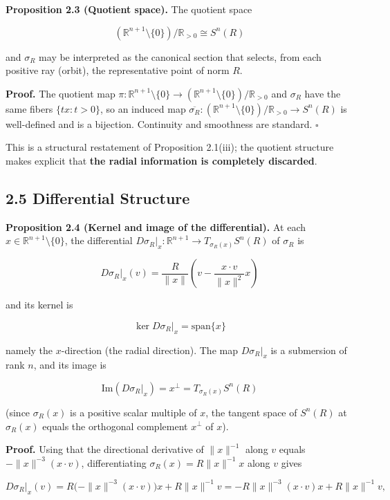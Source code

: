\documentclass[
]{ltjsarticle}
\begin{document}
\textbf{Proposition 2.3 (Quotient space).} The quotient space

\[(\mathbb{R}^{n+1} \setminus \{0\}) / \mathbb{R}_{>0} \cong S^n(R)\]

and \(\sigma_R\) may be interpreted as the canonical section that
selects, from each positive ray (orbit), the representative point of
norm \(R\).

\textbf{Proof.} The quotient map
\(\pi: \mathbb{R}^{n+1} \setminus \{0\} \to (\mathbb{R}^{n+1} \setminus \{0\}) / \mathbb{R}_{>0}\)
and \(\sigma_R\) have the same fibers \(\{tx : t > 0\}\), so an induced
map
\(\overline{\sigma_R}: (\mathbb{R}^{n+1} \setminus \{0\}) / \mathbb{R}_{>0} \to S^n(R)\)
is well-defined and is a bijection. Continuity and smoothness are
standard. \(\square\)

This is a structural restatement of Proposition 2.1(iii); the quotient
structure makes explicit that \textbf{the radial information is
completely discarded}.

\subsection{2.5 Differential Structure}\label{differential-structure}

\textbf{Proposition 2.4 (Kernel and image of the differential).} At each
\(x \in \mathbb{R}^{n+1} \setminus \{0\}\), the differential
\(D\sigma_R|_x: \mathbb{R}^{n+1} \to T_{\sigma_R(x)} S^n(R)\) of
\(\sigma_R\) is

\[D\sigma_R|_x (v) = \frac{R}{\|x\|}\left(v - \frac{x \cdot v}{\|x\|^2} x\right) \tag{2.2}\]

and its kernel is

\[\ker D\sigma_R|_x = \mathrm{span}\{x\} \tag{2.3}\]

namely the \(x\)-direction (the radial direction). The map
\(D\sigma_R|_x\) is a submersion of rank \(n\), and its image is

\[\mathrm{Im}(D\sigma_R|_x) = x^\perp = T_{\sigma_R(x)} S^n(R) \tag{2.4}\]

(since \(\sigma_R(x)\) is a positive scalar multiple of \(x\), the
tangent space of \(S^n(R)\) at \(\sigma_R(x)\) equals the orthogonal
complement \(x^\perp\) of \(x\)).

\textbf{Proof.} Using that the directional derivative of \(\|x\|^{-1}\)
along \(v\) equals \(-\|x\|^{-3}(x \cdot v)\), differentiating
\(\sigma_R(x) = R \|x\|^{-1} x\) along \(v\) gives

\[D\sigma_R|_x(v) = R \big(-\|x\|^{-3} (x \cdot v)\big) x + R \|x\|^{-1} v = -R \|x\|^{-3} (x \cdot v) x + R \|x\|^{-1} v,\]
\end{document}
